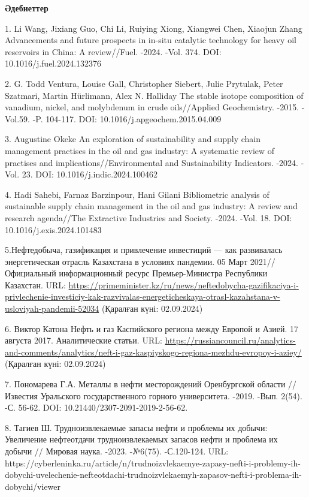 \begin{center}
  {\bfseries Әдебиеттер}
  \end{center}
  \begin{references}


1. Li Wang, Jixiang Guo, Chi Li, Ruiying Xiong, Xiangwei Chen, Xiaojun
Zhang Advancements and future prospects in in-situ catalytic technology
for heavy oil reservoirs in China: A review//Fuel. -2024. -Vol. 374.
DOI: 10.1016/j.fuel.2024.132376

2. G. Todd Ventura, Louise Gall, Christopher Siebert, Julie Prytulak,
Peter Szatmari, Martin Hürlimann, Alex N. Halliday The stable isotope
composition of vanadium, nickel, and molybdenum in crude oils//Applied
Geochemistry. -2015. -Vol.59. -P. 104-117. DOI:
10.1016/j.apgeochem.2015.04.009

3. Augustine Okeke An exploration of sustainability and supply chain
management practises in the oil and gas industry: A systematic review of
practises and implications//Environmental and Sustainability Indicators.
-2024. -Vol. 23. DOI: 10.1016/j.indic.2024.100462

4. Hadi Sahebi, Farnaz Barzinpour, Hani Gilani Bibliometric analysis of
sustainable supply chain management in the oil and gas industry: A
review and research agenda//The Extractive Industries and Society.
-2024. -Vol. 18. DOI: 10.1016/j.exis.2024.101483

5.Нефтедобыча, газификация и привлечение инвестиций --- как развивалась
энергетическая отрасль Казахстана в условиях пандемии. 05 Март
2021//Официальный информационный ресурс Премьер-Министра Республики
Казахстан. URL:
\url{https://primeminister.kz/ru/news/neftedobycha-gazifikaciya-i-privlechenie-investiciy-kak-razvivalas-energeticheskaya-otrasl-kazahstana-v-usloviyah-pandemii-52034}
(Қаралған күні: 02.09.2024)

6. Виктор Катона Нефть и газ Каспийского региона между Европой и Азией.
17 августа 2017. Аналитические статьи. URL:
\url{https://russiancouncil.ru/analytics-and-comments/analytics/neft-i-gaz-kaspiyskogo-regiona-mezhdu-evropoy-i-aziey/}
(Қаралған күні: 02.09.2024)

7. Пономарева Г.А. Металлы в нефти месторождений Оренбургской области
//Известия Уральского государственного горного университета. -2019.
-Вып. 2(54). -С. 56-62. DOI: 10.21440/2307-2091-2019-2-56-62.

8. Тагиев Ш. Трудноизвлекаемые запасы нефти и проблемы их добычи:
Увеличение нефтеотдачи трудноизвлекаемых запасов нефти и проблема их
добычи // Мировая наука. -2023. -№6(75). -С.120-124. URL:
https://cyberleninka.ru/article/n/trudnoizvlekaemye-zapasy-nefti-i-problemy-ih-dobychi-uvelechenie-nefteotdachi-trudnoizvlekaemyh-zapasov-nefti-i-problema-ih-dobychi/viewer


\end{references}
